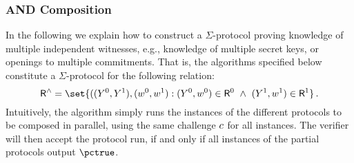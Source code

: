 \documentclass[runningheads,11pt]{article}
\begin{document}
\subsubsection{AND Composition}
  In the following we explain how to construct a $\Sigma$-protocol proving knowledge of multiple independent witnesses, e.g., knowledge of multiple secret keys, or openings to multiple commitments.
  That is, the algorithms specified below constitute a $\Sigma$-protocol for the following relation:
\[
  \relation^\land = \set{
    ((\statement^0,\statement^1),(\witness^0,\witness^1) : (\statement^0,\witness^0)\in \relation^0 ~\land~ (\statement^1,\witness^1)\in\relation^1}\,.
\]
  Intuitively, the algorithm simply runs the instances of the different protocols to be composed in parallel, using the same challenge $c$ for all instances.
	The verifier will then accept the protocol run, if and only if all instances of the partial protocols output $\accept$.
\end{document}
